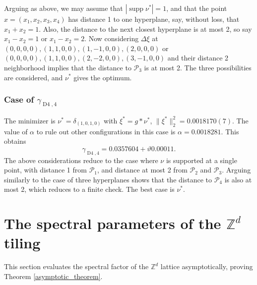 \documentclass[a4paper, 12pt, notitlepage]{amsart}
\newcommand{\Dfour}{\operatorname{D4}}
\newcommand{\supp}{\operatorname{supp}}
\newcommand{\zed}{\mathbb{Z}}
\newcommand{\sP}{{\mathscr{P}}}
\theoremstyle{remark}
\begin{document}
Arguing as above, we may assume that $|\supp \nu^*| = 1$, and that the point $x = (x_1, x_2, x_3, x_4)$ has distance 1 to one hyperplane, say, without loss, that $x_1 + x_2 = 1$.  Also, the distance to the next closest hyperplane is at most 2, so say $x_1 - x_2 = 1$ or $x_1 - x_2 = 2$.  Now considering $\Delta \xi$ at $(0,0,0,0), (1,1,0,0), (1,-1,0,0), (2,0,0,0)$ or $(0,0,0,0), (1,1,0,0), (2,-2,0,0), (3,-1,0,0)$ and their distance 2 neighborhood implies that the distance to $\sP_3$ is at most 2.  The three possibilities are considered, and $\nu^*$ gives the optimum. 

\subsubsection*{Case of $\gamma_{\Dfour,4}$}
   The minimizer is $\nu^* = \delta_{(1,0,1,0)}$ with $\xi^* = g*\nu^*$, $\|\xi^*\|_2^2 = 0.0018170(7)$. The value of $\alpha$ to rule out other configurations in this case is $\alpha = 0.0018281$. This obtains
\begin{equation*}
 \gamma_{\Dfour,4} = 0.0357604+ \vartheta 0.00011.
\end{equation*}
      The above considerations reduce to the case where $\nu$ is supported at a single point, with distance 1 from $\sP_1$, and distance at most 2 from $\sP_2$ and $\sP_3$.  Arguing similarly to the case of three hyperplanes shows that the distance to $\sP_4$ is also at most 2, which reduces to a finite check.  The best case is $\nu^*$.  


\section{The spectral parameters of the $\zed^d$ tiling} \label{zd_section}

This section evaluates the spectral factor of the $\zed^d$ lattice asymptotically, proving Theorem \ref{asymptotic_theorem}.
\end{document}
